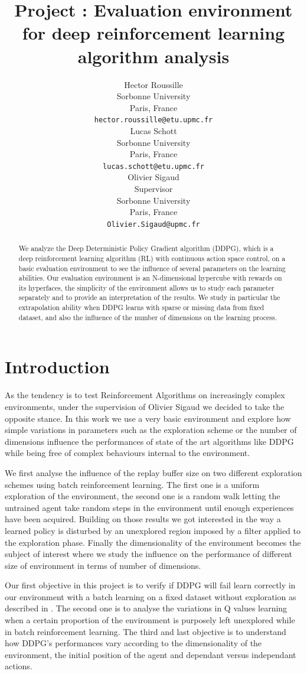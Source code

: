 \documentclass{article}
\title{Project : Evaluation environment for deep reinforcement learning algorithm analysis}
\author{
    Hector Roussille\\
    Sorbonne University\\
    Paris, France\\
    \texttt{hector.roussille@etu.upmc.fr} \\
    \And
    Lucas Schott\\
    Sorbonne University\\
    Paris, France\\
    \texttt{lucas.schott@etu.upmc.fr} \\
   \AND
    Olivier Sigaud\\
    Supervisor\\
    Sorbonne University\\
    Paris, France\\
   \texttt{Olivier.Sigaud@upmc.fr} \\
}
\begin{document}
\maketitle

\begin{abstract}
We analyze the Deep Deterministic Policy Gradient algorithm (DDPG), which is a deep reinforcement learning algorithm (RL) with continuous action space control, on a basic evaluation environment to see the influence of several parameters on the learning abilities. Our evaluation environment is an N-dimensional hypercube with rewards on its hyperfaces, the simplicity of the environment allows us to study each parameter separately and to provide an interpretation of the results. We study in particular the extrapolation ability when DDPG learns with sparse or missing data from fixed dataset, and also the influence of the number of dimensions on the learning process.
\end{abstract}


\section{Introduction}

As the tendency is to test Reinforcement Algorithms on increasingly complex environments, under the supervision of Olivier Sigaud we decided to take the opposite stance. In this work we use a very basic environment and explore how simple variations in parameters such as the exploration scheme or the number of dimensions influence the performances of state of the art algorithms like DDPG while being free of complex behaviours internal to the environment.

We first analyse the influence of the replay buffer size on two different exploration schemes using batch reinforcement learning. The first one is a uniform exploration of the environment, the second one is a random walk letting the untrained agent take random steps in the environment until enough experiences have been acquired. Building on those results we got interested in the way a learned policy is disturbed by an unexplored region imposed by a filter applied to the exploration phase. Finally the dimensionality of the environment becomes the subject of interest where we study the influence on the performance of different size of environment in terms of number of dimensions.

Our first objective in this project is to verify if DDPG will fail learn correctly in our environment with a batch learning on a fixed dataset without exploration as described in \cite{fujimoto_off-policy_2018}. The second one is to analyse the variations in Q values learning when a certain proportion of the environment is purposely left unexplored while in batch reinforcement learning. The third and last objective is to understand how DDPG's performances vary according to the dimensionality of the environment, the initial position of the agent and dependant versus independant actions.  
\end{document}
